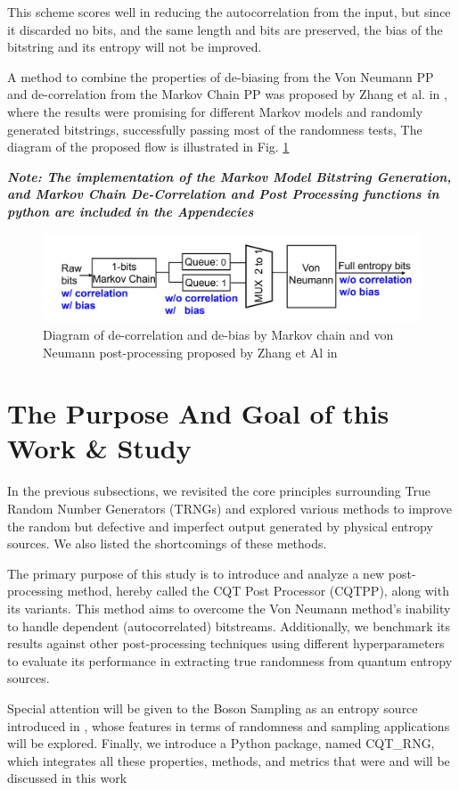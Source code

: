This scheme scores well in reducing the autocorrelation from the input, but since it discarded no bits, and the same length and bits are preserved, the bias of the bitstring and its entropy will not be improved.

A method to combine the properties of de-biasing from the Von Neumann PP and de-correlation from the Markov Chain PP was proposed by Zhang et al. in \cite{dede}, where the results were promising for different Markov models and randomly generated bitstrings, successfully passing most of the randomness tests, The diagram of the proposed flow is illustrated in Fig. \ref{fig:zhang}

\textbf{\textit{Note: The implementation of the Markov Model Bitstring Generation, and Markov Chain De-Correlation and Post Processing functions in python are included in the Appendecies}}


\begin{figure}
\centering
\includegraphics[width=16cm]{figures/ZHANG.png}\vspace{-0.2cm}
\caption{Diagram of de-correlation and de-bias by Markov chain and von
Neumann post-processing proposed by Zhang et Al in \cite{dede}}
\label{fig:zhang}
\end{figure}

\section{The Purpose And Goal of this Work \& Study}
In the previous subsections, we revisited the core principles surrounding True Random Number Generators (TRNGs) and explored various methods to improve the random but defective and imperfect output generated by physical entropy sources. We also listed the shortcomings of these methods.

The primary purpose of this study is to introduce and analyze a new post-processing method, hereby called the CQT Post Processor (CQTPP), along with its variants. This method aims to overcome the Von Neumann method's inability to handle dependent (autocorrelated) bitstreams. Additionally, we benchmark its results against other post-processing techniques using different hyperparameters to evaluate its performance in extracting true randomness from quantum entropy sources.

Special attention will be given to the Boson Sampling as an entropy source introduced in \cite{shi_Twa3na}, whose features in terms of randomness and sampling applications will be explored. Finally, we introduce a Python package, named CQT\_RNG, which integrates all these properties, methods, and metrics that were and will be discussed in this work
 






